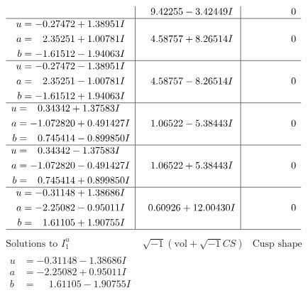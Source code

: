 \documentclass[1p]{elsarticle_modified}
\theoremstyle{definition}
\newcommand{\I}{\sqrt{-1}}
\begin{document}
$$\begin{array}{c|c|c}
 & \phantom{-}9.42255 - 3.42449 I & \phantom{-0.000000 } 0 \\ \hline\begin{aligned}
u &= -0.27472 + 1.38951 I \\
a &= \phantom{-}2.35251 + 1.00781 I \\
b &= -1.61512 - 1.94063 I\end{aligned}
 & \phantom{-}4.58757 + 8.26514 I & \phantom{-0.000000 } 0 \\ \hline\begin{aligned}
u &= -0.27472 - 1.38951 I \\
a &= \phantom{-}2.35251 - 1.00781 I \\
b &= -1.61512 + 1.94063 I\end{aligned}
 & \phantom{-}4.58757 - 8.26514 I & \phantom{-0.000000 } 0 \\ \hline\begin{aligned}
u &= \phantom{-}0.34342 + 1.37583 I \\
a &= -1.072820 + 0.491427 I \\
b &= \phantom{-}0.745414 - 0.899850 I\end{aligned}
 & \phantom{-}1.06522 - 5.38443 I & \phantom{-0.000000 } 0 \\ \hline\begin{aligned}
u &= \phantom{-}0.34342 - 1.37583 I \\
a &= -1.072820 - 0.491427 I \\
b &= \phantom{-}0.745414 + 0.899850 I\end{aligned}
 & \phantom{-}1.06522 + 5.38443 I & \phantom{-0.000000 } 0 \\ \hline\begin{aligned}
u &= -0.31148 + 1.38686 I \\
a &= -2.25082 - 0.95011 I \\
b &= \phantom{-}1.61105 + 1.90755 I\end{aligned}
 & \phantom{-}0.60926 + 12.00430 I & \phantom{-0.000000 } 0\\
 \hline 
 \end{array}$$\newpage$$\begin{array}{c|c|c}  
\text{Solutions to }I^u_{1}& \I (\text{vol} + \sqrt{-1}CS) & \text{Cusp shape}\\
 \hline 
\begin{aligned}
u &= -0.31148 - 1.38686 I \\
a &= -2.25082 + 0.95011 I \\
b &= \phantom{-}1.61105 - 1.90755 I\end{aligned}

\end{array}$$
\end{document}
